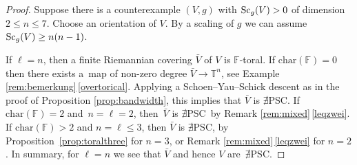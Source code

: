 \documentclass[10pt,a4paper]{amsart}
\numberwithin{equation}{section}
\newcommand{\F}{\mathbb{F}}
\newcommand{\TTT}{\mathbb{T}}
\newcommand{\charac}{\mathrm{char}}
\newcommand{\Sc}{{\rm Sc}}
\newcommand{\no}{{\color{brown!70!black}$\nexists$}{\sf PSC}}
\begin{document}
\begin{proof} Suppose there is a counterexample $(V,g)$ with $\Sc_g(V) > 0$ of dimension $2 \leq n \leq 7$.
Choose an orientation of $V$.
By a scaling of $g$ we can assume $\Sc_g(V) \geq n(n-1)$.

If $\ell = n$, then a finite Riemannian covering $\bar V$ of $V$ is $\mathbb{F}$-toral.
If $\charac(\F) = 0$ then there exists a~map of non-zero degree $\bar V \to {\TTT}^n$, see Example \ref{rem:bemerkung}\,\ref{overtorical}.
Applying a Schoen--Yau--Schick descent as in the proof of Proposition \ref{prop:bandwidth}, this implies that $\bar V$ is \no.
If $\charac(\F) = 2$ and~${n = \ell = 2}$, then~$\bar V$ is \no~by Remark \ref{rem:mixed}\,\ref{leqzwei}.
If $\charac(\F) > 2$ and $n = \ell \leq 3$, then $\bar V$ is \no, by Proposition~\ref{prop:toralthree} for $n =3$, or Remark \ref{rem:mixed}\,\ref{leqzwei} for $n = 2$.
In summary, for $\ell = n$ we see that $\bar V$ and hence $V$ are~\no.


\end{proof}
\end{document}
